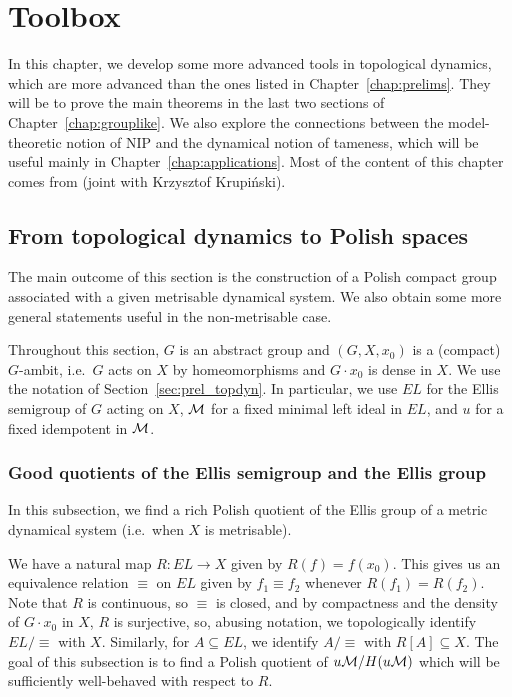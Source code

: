 \chapter{Toolbox}
	\label{chap:toolbox}
	In this chapter, we develop some more advanced tools in topological dynamics, which are more advanced than the ones listed in Chapter~\ref{chap:prelims}. They will be to prove the main theorems in the last two sections of Chapter~\ref{chap:grouplike}. We also explore the connections between the model-theoretic notion of NIP and the dynamical notion of tameness, which will be useful mainly in Chapter~\ref{chap:applications}. Most of the content of this chapter comes from \cite{KR18} (joint with Krzysztof Krupiński).
	\section{From topological dynamics to Polish spaces}
	\label{sec:top_dyn_to_Polish}
	The main outcome of this section is the construction of a Polish compact group associated with a given metrisable dynamical system. We also obtain some more general statements useful in the non-metrisable case.
	
	Throughout this section, $G$ is an abstract group and $(G,X,x_0)$ is a (compact) $G$-ambit, i.e.\ $G$ acts on $X$ by homeomorphisms and $G\cdot x_0$ is dense in $X$.
	We use the notation of Section~\ref{sec:prel_topdyn}. In particular, we use $EL$ for the Ellis semigroup of $G$ acting on $X$, ${\mathcal M}$ for a fixed minimal left ideal in $EL$, and $u$ for a fixed idempotent in ${\mathcal M}$.
	
	\subsection*{Good quotients of the Ellis semigroup and the Ellis group}
	In this subsection, we find a rich Polish quotient of the Ellis group of a metric dynamical system (i.e.\ when $X$ is metrisable).
	
	We have a natural map $R\colon EL\to X$ given by $R(f)=f(x_0)$. This gives us an equivalence relation $\equiv$ on $EL$ given by $f_1\equiv f_2$ whenever $R(f_1)=R(f_2)$. Note that $R$ is continuous, so $\equiv$ is closed, and by compactness and the density of $G\cdot x_0$ in $X$, $R$ is surjective, so, abusing notation, we topologically identify $EL/{\equiv}$ with $X$. Similarly, for $A\subseteq EL$, we identify $A/{\equiv}$ with $R[A]\subseteq X$. The goal of this subsection is to find a Polish quotient of $u{\mathcal M}/H(u{\mathcal M})$ which will be sufficiently well-behaved with respect to $R$.
	
